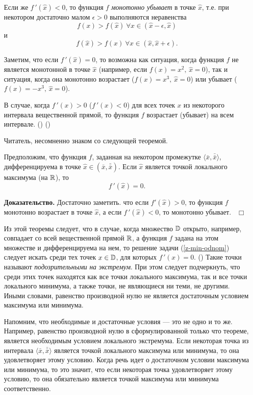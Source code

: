     Если же $f\,'(\hat{x})<0$, то функция $f$ \emph{монотонно убывает}
    в точке $\hat{x}$, т.е. при
    некотором достаточно малом $\epsilon>0$ выполняются неравенства
    \[f(x)>f(\hat{x}) \ \forall x\in(\hat{x}-\epsilon,\hat{x})\]
    и
    \[f(\hat{x})>f(x) \ \forall x\in(\hat{x},\hat{x}+\epsilon).\]


     Заметим, что если $f\,'(\hat{x})=0$, то
    возможна как ситуация, когда функция $f$ не является монотонной
    в точке $\hat{x}$ (например, если $f(x)=x^{2}, \ \hat{x}=0$), так и ситуация,
    когда она монотонно возрастает ($f(x)=x^{3}, \ \hat{x}=0$) или
    убывает ($f(x)=-x^{3}, \ \hat{x}=0$).

    В случае, когда $f\,'(x)>0$ ($f\,'(x)<0$) для всех точек $x$ из
    некоторого интервала вещественной прямой, то функция $f$ возрастает
    (убывает) на всем интервале. ()
    ()

    Читатель, несомненно знаком со следующей теоремой.


\begin{teo}
    Предположим, что функция $f$, заданная на некотором промежутке
    $\langle \bar{x},\bar{\bar{x}}\rangle$, дифференцируема в точке
    $\hat{x}\in(\bar{x},\bar{\bar{x}})$.
    Если $\hat{x}$ является точкой локального
    максимума (на $\mathbb{R}$), то
    \[f\,'(\hat{x})=0.\]
\end{teo}
    \textbf{Доказательство.} Достаточно заметить. что если $f'(\hat{x})>0$,
    то функция $f$ монотонно возрастает в точке $\hat{x}$,  а если
    $f\,'(\hat{x})<0$, то монотонно убывает. \ $\Box$


    Из этой теоремы следует, что в случае, когда множество $\mathbb{D}$
    открыто, например, совпадает со всей вещественной прямой $\mathbb{R}$,
    а функция $f$ задана на этом множестве и
    дифференцируема на нем, то решение задачи (\ref{z-min-odnom})
    следует искать среди тех точек $x\in\mathbb{D}$, для которых
    $f\,'(x)=0$. () Такие точки называют \emph{подозрительными на
    экстремум}. При этом следует подчеркнуть, что среди этих точек
    находятся как все точки локального
    максимума, так и все точки локального минимума, а также точки,
    не являющиеся ни теми, не другими. Иными словами, равенство
    производной нулю не является достаточным условием максимума или
    минимума.

    Напомним, что необходимые и достаточные условия --- это не одно и то же.
    Например, равенство производной нулю в
    сформулированной только что теореме, является необходимым
    условием локального экстремума. Если некоторая точка из
    интервала  $\langle \bar{x},\bar{\bar{x}}\rangle$
    является точкой локального максимума или минимума, то она
    удовлетворяет этому условию. Когда речь идет о достаточном
    условии максимума или минимума, то это значит, что если некоторая точка
    удовлетворяет этому условию, то она обязательно является
    точкой максимума или минимума соответственно.

